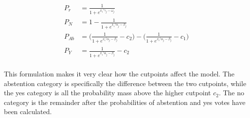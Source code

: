  \begin{align*}
 	 P_r &= \frac{1}{1 + e^{x_i'\gamma_j - \omega_j}}\\
 	P_N &= 1 - \frac{1}{1 + e^{x_i'\alpha_j - \beta_j}}\\
 	P_{Ab} &= \Big( \frac{1}{1 + e^{x_i'\alpha_j - \beta_j}} - c_2 \Big) - \Big( \frac{1}{1 + e^{x_i'\alpha_j - \beta_j}} - c_1 \Big) \\
 	P_Y &= \frac{1}{1 + e^{x_i'\alpha_j - \beta_j}} - c_2 \\
 \end{align*}

This formulation makes it very clear how the cutpoints affect the model. The abstention category is specifically the difference between the two cutpoints, while the yes category is all the probability mass above the higher cutpoint $c_2$. The no category is the remainder after the probabilities of abstention and yes votes have been calculated.

 


